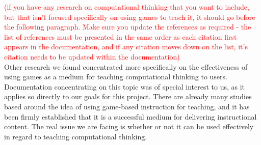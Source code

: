 \documentclass{article}
\newcommand\todo[1]{\textcolor{red}{#1}}
\begin{document}
\todo{(if you have any research on computational thinking that you want to include,
but that isn’t focused specifically on using games to teach it, it should go
before the following paragraph. Make sure you update the references as required
- the list of references must be presented in the same order as each citation
first appears in the documentation, and if any citation moves down on the list,
it’s citation needs to be updated within the documentation)}\\

Other research we found concentrated more specifically on the effectiveness of
using games as a medium for teaching computational thinking to users.
Documentation concentrating on this topic was of special interest to us, as it
applies so directly to our goals for this project. There are already many
studies based around the idea of using game-based instruction for teaching, and
it has been firmly established that it is a successful medium for delivering
instructional content. The real issue we are facing is whether or not it can be
used effectively in regard to teaching computational thinking.\\
\end{document}

